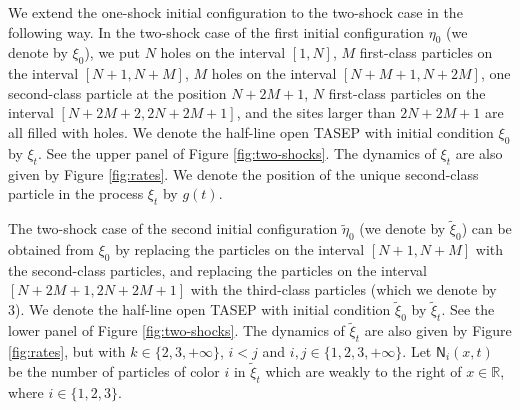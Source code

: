 \documentclass[12pt,a4paper]{amsart}
\theoremstyle{remark}
\numberwithin{equation}{section} \numberwithin{theorem}{section}
\begin{document}
We extend the one-shock initial configuration to the two-shock case in the following way. In the two-shock case of the first initial configuration $\eta_0$ (we denote by $\xi_0$), we put $N$ holes on the interval $[1, N]$, $M$ first-class particles on the interval $[N+1, N+M]$, $M$ holes on the interval $[N+M+1, N+2M]$, one second-class particle at the position $N+2M+1$, $N$ first-class particles on the interval $[N+2M+2, 2N+2M+1]$, and the sites larger than $2N+2M+1$ are all filled with holes. We denote the half-line open TASEP with initial condition $\xi_0$ by $\xi_t$. See the upper panel of Figure \ref{fig:two-shocks}. The dynamics of $\xi_t$ are also given by Figure \ref{fig:rates}. We denote the position of the unique second-class particle in the process $\xi_{t}$ by $g(t)$. 

The two-shock case of the second initial configuration $\tilde{\eta}_0$ (we denote by $\tilde{\xi}_0$) can be obtained from $\xi_0$ by replacing the particles on the interval $[N+1, N+M]$ with the second-class particles, and replacing the particles on the interval $[N+2M+1, 2N+2M+1]$ with the third-class particles (which we denote by 3). We denote the half-line open TASEP with initial condition $\tilde{\xi}_0$ by $\tilde{\xi}_t$. See the lower panel of Figure \ref{fig:two-shocks}. The dynamics of $\tilde{\xi}_t$ are also given by Figure \ref{fig:rates}, but with $k \in \{2, 3, +\infty\}$, $i < j$ and $i,j \in \{1,2, 3, +\infty\}$. Let $\mathsf{N}_{i}(x,t)$ be the number of particles of color $i$ in $\tilde\xi_{t}$ which are weakly to the right of $x\in \mathbb{R}$, where $i \in \{1,2,3\}$.
\end{document}
